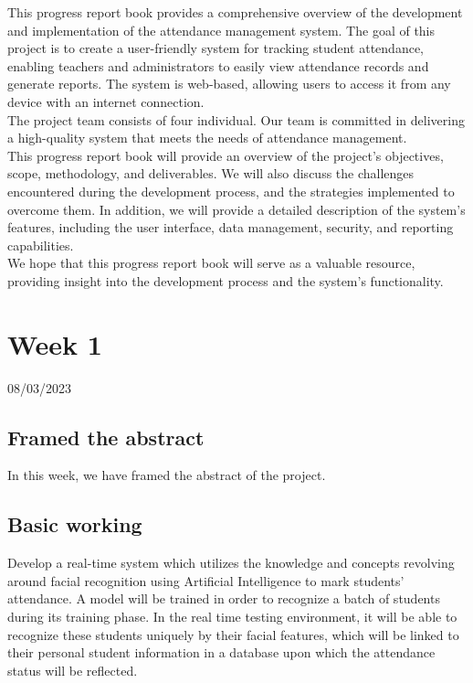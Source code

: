 \documentclass[12pt]{book}
\begin{document}
    \begin{flushleft}
    	This progress report book provides a comprehensive overview of the development and implementation of the attendance management system. The goal of this project is to create a user-friendly system for tracking student attendance, enabling teachers and administrators to easily view attendance records and generate reports. The system is web-based, allowing users to access it from any device with an internet connection. \\[6pt]
    	
    	The project team consists of four individual. Our team is committed in delivering a high-quality system that meets the needs of attendance management. \\[6pt]
    	
    	This progress report book will provide an overview of the project's objectives, scope, methodology, and deliverables. We will also discuss the challenges encountered during the development process, and the strategies implemented to overcome them. In addition, we will provide a detailed description of the system's features, including the user interface, data management, security, and reporting capabilities. \\[6pt]
    	
    	We hope that this progress report book will serve as a valuable resource, providing insight into the development process and the system's functionality.
    \end{flushleft}
    
    
    
    \tableofcontents


    \chapter{Week 1}
    \justifying
    \large
    08/03/2023 \\[10pt]
    
    
    \setcounter{page}{1}
    	
    \paragraph{}
    \section{Framed the abstract}
    In this week, we have framed the abstract of the project.  
    \section{Basic working}
    Develop a real-time system which utilizes
    the knowledge and concepts revolving around facial
    recognition using Artificial Intelligence to mark students’
    attendance. A model will be trained in order to recognize a
    batch of students during its training phase. In the real time
    testing environment, it will be able to recognize these
    students uniquely by their facial features, which will be linked
    to their personal student information in a database upon
    which the attendance status will be reflected. \\
    
\end{document}
